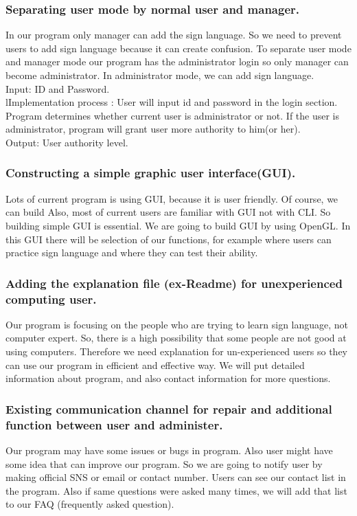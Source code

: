 \documentclass[10pt,journal,compsoc]{IEEEtran}
\begin{document}
\subsubsection{Separating user mode by normal user and manager.}
In our program only manager can add the sign language. So we need to prevent users to add sign language because it can create confusion. To separate user mode and manager mode our program has the administrator login so only manager can become administrator. In administrator mode, we can add sign language.
\\Input:   ID and Password.
\\lImplementation process :  User will input id and password in the login section. Program determines whether current user is administrator or not. If the user is administrator, program will grant user more authority to him(or her).
\\Output:   User authority level.

\subsubsection{ Constructing a simple graphic user interface(GUI).}
Lots of current program is using GUI, because it is user friendly. Of course, we can build Also, most of current users are familiar with GUI not with CLI.  So building simple GUI is essential. We are going to build GUI by using OpenGL. In this GUI there will be selection of our functions, for example where users can practice sign language and where they can test their ability.

\subsubsection{ Adding the explanation file (ex-Readme) for unexperienced computing user.}
Our program is focusing on the people who are trying to learn sign language, not computer expert. So, there is a high possibility that some people are not good at using computers. Therefore we need explanation for un-experienced users so they can use our program in efficient and effective way. We will put detailed information about program, and also contact information for more questions.

\subsubsection{ Existing communication channel for repair and additional function between user and administer.}
Our program may have some issues or bugs in program. Also user might have some idea that can improve our program. So we are going to notify user by making official SNS or email or contact number. Users can see our contact list in the program. Also if same questions were asked many times, we will add that list to our FAQ (frequently asked question).
\end{document}
